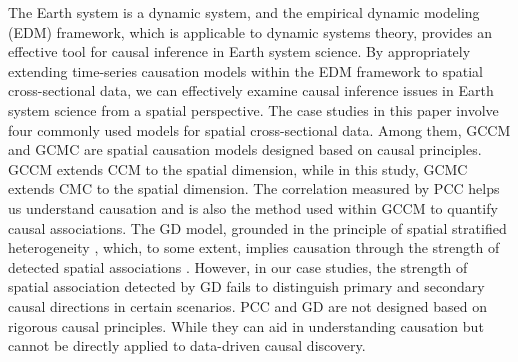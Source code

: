 \documentclass[authoryear,preprint,review,12pt]{elsarticle}
\begin{document}
The Earth system is a dynamic system, and the empirical dynamic modeling (EDM) framework, which is applicable to dynamic systems theory\citep{ma2017cme,leng2020pcm,tao2023cmc}, provides an effective tool for causal inference in Earth system science\citep{gao2023gccm}. By appropriately extending time-series causation models within the EDM framework to spatial cross-sectional data, we can effectively examine causal inference issues in Earth system science from a spatial perspective. The case studies in this paper involve four commonly used models for spatial cross-sectional data. Among them, GCCM and GCMC are spatial causation models designed based on causal principles. GCCM extends CCM to the spatial dimension, while in this study, GCMC extends CMC to the spatial dimension. The correlation measured by PCC helps us understand causation and is also the method used within GCCM to quantify causal associations. The GD model, grounded in the principle of spatial stratified heterogeneity \citep{wang2010gd1,wang2016gd2,lyu2025gdverse}, which, to some extent, implies causation through the strength of detected spatial associations \citep{wang2024gd3}. However, in our case studies, the strength of spatial association detected by GD fails to distinguish primary and secondary causal directions in certain scenarios. PCC and GD are not designed based on rigorous causal principles. While they can aid in understanding causation but cannot be directly applied to data-driven causal discovery. 
\end{document}
